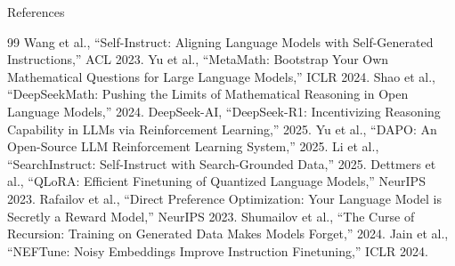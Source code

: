 \documentclass[aspectratio=169,10pt]{beamer}
\begin{document}
\begin{frame}[allowframebreaks]{References}
\footnotesize
\begin{thebibliography}{99}
   Wang et al., ``Self-Instruct: Aligning Language Models with Self-Generated Instructions,'' ACL 2023.
   Yu et al., ``MetaMath: Bootstrap Your Own Mathematical Questions for Large Language Models,'' ICLR 2024.
   Shao et al., ``DeepSeekMath: Pushing the Limits of Mathematical Reasoning in Open Language Models,'' 2024.
   DeepSeek-AI, ``DeepSeek-R1: Incentivizing Reasoning Capability in LLMs via Reinforcement Learning,'' 2025.
   Yu et al., ``DAPO: An Open-Source LLM Reinforcement Learning System,'' 2025.
   Li et al., ``SearchInstruct: Self-Instruct with Search-Grounded Data,'' 2025.
   Dettmers et al., ``QLoRA: Efficient Finetuning of Quantized Language Models,'' NeurIPS 2023.
   Rafailov et al., ``Direct Preference Optimization: Your Language Model is Secretly a Reward Model,'' NeurIPS 2023.
   Shumailov et al., ``The Curse of Recursion: Training on Generated Data Makes Models Forget,'' 2024.
   Jain et al., ``NEFTune: Noisy Embeddings Improve Instruction Finetuning,'' ICLR 2024.
\end{thebibliography}
\end{frame}
\end{document}
